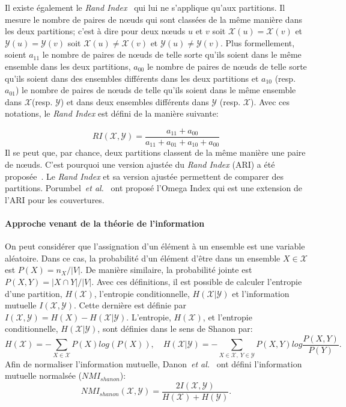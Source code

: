 Il existe également le \emph{Rand Index}~\cite{Rand1971} qui lui ne s'applique qu'aux partitions.
Il mesure le nombre de paires de n\oe uds qui sont classées de la même manière dans les deux partitions; c'est à dire pour deux n\oe uds $u$ et $v$ soit $\mathcal{X}(u)=\mathcal{X}(v)$ et $\mathcal{Y}(u)=\mathcal{Y}(v)$ soit $\mathcal{X}(u)\neq \mathcal{X}(v)$ et $\mathcal{Y}(u)\neq \mathcal{Y}(v)$.
Plus formellement, soient $a_{11}$ le nombre de paires de n\oe uds de telle sorte qu'ils soient dans le même ensemble dans les deux partitions, $a_{00}$ le nombre de paires de n\oe uds de telle sorte qu'ils soient dans des ensembles différents dans les deux partitions et $a_{10}$ (resp. $a_{01}$) le nombre de paires de n\oe uds de telle qu'ils soient dans le même ensemble dans $\mathcal{X}$(resp. $\mathcal{Y}$) et dans deux ensembles différents dans $\mathcal{Y}$ (resp. $\mathcal{X}$).
Avec ces notations, le \emph{Rand Index} est défini de la manière suivante:

\begin{equation}
RI(\mathcal{X},\mathcal{Y}) = \dfrac{a_{11} + a_{00}}{a_{11}+a_{01}+a_{10}+ a_{00}}
\end{equation}
Il se peut que, par chance, deux partitions classent de la même manière une paire de n\oe uds.
C'est pourquoi une version ajustée du \emph{Rand Index} (ARI) a été proposée~\cite{Hubert1985}.
Le \emph{Rand Index} et sa version ajustée permettent de comparer des partitions.
Porumbel~\emph{et al.}~\cite{Porumbel2011} ont proposé l'Omega Index qui est une extension de l'ARI pour les couvertures.

\paragraph{Approche venant de la théorie de l'information}
On peut considérer que l'assignation d'un élément à un ensemble est une variable aléatoire.
Dans ce cas, la probabilité d'un élément d'être dans un ensemble $X \in \mathcal{X}$ est $P(X)= n_X/|V|$.
De manière similaire, la probabilité jointe est $P(X,Y) = |X \cap Y|/|V|$.
Avec ces définitions, il est possible de calculer l'entropie d'une partition, $H(\mathcal{X})$, l'entropie conditionnelle, $H(\mathcal{X}|\mathcal{Y})$ et l'information mutuelle $I(\mathcal{X},\mathcal{Y})$.
Cette dernière est définie par $I(\mathcal{X}, \mathcal{Y}) = H(X) - H(\mathcal{X}|\mathcal{Y})$.
L'entropie, $H(\mathcal{X})$, et l'entropie conditionnelle, $H(\mathcal{X}|\mathcal{Y})$, sont définies dans le sens de Shanon par: 
\begin{equation}
H(\mathcal{X}) = - \sum_{X \in \mathcal{X}} P(X)log(P(X)),\quad H(\mathcal{X}|\mathcal{Y}) = -\sum_{X \in \mathcal{X},\ Y \in \mathcal{Y}} P(X, Y) log \dfrac{P(X,Y)}{P(Y)}.
\end{equation}
Afin de normaliser l'information mutuelle, Danon~\emph{et al.}~\cite{Danon2005a} ont défini l'information mutuelle normalsée ($NMI_{shanon}$):
\begin{equation}
 NMI_{shanon}(\mathcal{X},\mathcal{Y}) = \dfrac{2I(\mathcal{X},\mathcal{Y})}{H(\mathcal{X})+H(\mathcal{Y})}.
\end{equation}

